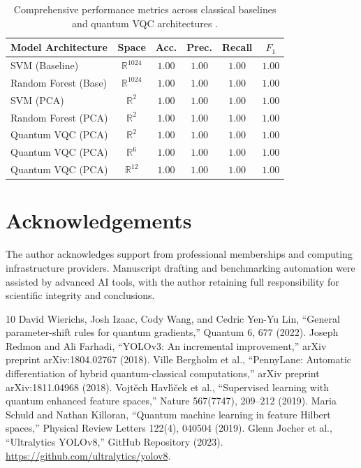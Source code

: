 \documentclass[10pt,twocolumn,letterpaper]{article}
\begin{document}
\begin{table}[htbp]
\centering
\small
\begin{tabular}{lccccc}
\toprule
\textbf{Model Architecture} & \textbf{Space} & \textbf{Acc.} & \textbf{Prec.} & \textbf{Recall} & \textbf{$F_1$} \\
\midrule
SVM (Baseline) & $\mathbb{R}^{1024}$ & $1.00$ & $1.00$ & $1.00$ & $1.00$ \\
Random Forest (Base) & $\mathbb{R}^{1024}$ & $1.00$ & $1.00$ & $1.00$ & $1.00$ \\
SVM (PCA) & $\mathbb{R}^2$ & $1.00$ & $1.00$ & $1.00$ & $1.00$ \\
Random Forest (PCA) & $\mathbb{R}^2$ & $1.00$ & $1.00$ & $1.00$ & $1.00$ \\
Quantum VQC (PCA) & $\mathbb{R}^2$ & $1.00$ & $1.00$ & $1.00$ & $1.00$ \\
Quantum VQC (PCA) & $\mathbb{R}^6$ & $1.00$ & $1.00$ & $1.00$ & $1.00$ \\
Quantum VQC (PCA) & $\mathbb{R}^{12}$ & $1.00$ & $1.00$ & $1.00$ & $1.00$ \\
\bottomrule
\end{tabular}
\caption{Comprehensive performance metrics across classical baselines and quantum VQC architectures \cite{ref3}.}
\label{tab:comprehensive_results}
\end{table}

\section{Acknowledgements}

The author acknowledges support from professional memberships and computing infrastructure providers. Manuscript drafting and benchmarking automation were assisted by advanced AI tools, with the author retaining full responsibility for scientific integrity and conclusions.

\begin{thebibliography}{10}
 David Wierichs, Josh Izaac, Cody Wang, and Cedric Yen-Yu Lin, ``General parameter-shift rules for quantum gradients,'' Quantum 6, 677 (2022).
 Joseph Redmon and Ali Farhadi, ``YOLOv3: An incremental improvement,'' arXiv preprint arXiv:1804.02767 (2018).
 Ville Bergholm et al., ``PennyLane: Automatic differentiation of hybrid quantum-classical computations,'' arXiv preprint arXiv:1811.04968 (2018).
 Vojt\v{e}ch Havl\'{\i}\v{c}ek et al., ``Supervised learning with quantum enhanced feature spaces,'' Nature 567(7747), 209--212 (2019).
 Maria Schuld and Nathan Killoran, ``Quantum machine learning in feature Hilbert spaces,'' Physical Review Letters 122(4), 040504 (2019).
 Glenn Jocher et al., ``Ultralytics YOLOv8,'' GitHub Repository (2023). \url{https://github.com/ultralytics/yolov8}.
\end{thebibliography}
\end{document}
